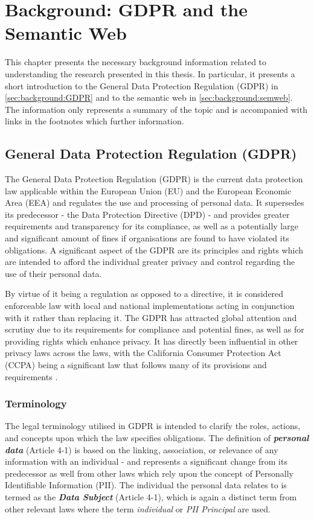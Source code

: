 \chapter{Background: GDPR and the Semantic Web}
\label{chapter:background}

This chapter presents the necessary background information related to understanding the research presented in this thesis. In particular, it presents a short introduction to the General Data Protection Regulation (GDPR) in \autoref{sec:background:GDPR} and to the semantic web in \autoref{sec:background:semweb}. The information only represents a summary of the topic and is accompanied with links in the footnotes which further information.

\section{General Data Protection Regulation (GDPR)}\label{sec:background:GDPR}
The General Data Protection Regulation (GDPR) \cite{noauthor_regulation_2016} is the current data protection law applicable within the European Union (EU) and the European Economic Area (EEA) and regulates the use and processing of personal data. 
It supersedes its predecessor - the Data Protection Directive (DPD) \cite{noauthor_directive_1995} - and provides greater requirements and transparency for its compliance, as well as a potentially large and significant amount of fines if organisations are found to have violated its obligations.
A significant aspect of the GDPR are its principles and rights which are intended to afford the individual greater privacy and control regarding the use of their personal data.

By virtue of it being a regulation as opposed to a directive, it is considered enforceable law with local and national implementations acting in conjunction with it rather than replacing it.
The GDPR has attracted global attention and scrutiny due to its requirements for compliance and potential fines, as well as for providing rights which enhance privacy.
It has directly been influential in other privacy laws across the laws, with the California Consumer Protection Act (CCPA) being a significant law that follows many of its provisions and requirements \cite{marini_gdpr_2018}.

\subsection{Terminology}
The legal terminology utilised in GDPR is intended to clarify the roles, actions, and concepts upon which the law specifies obligations.
The definition of \textit{\textbf{personal data}} (Article 4-1) is based on the linking, association, or relevance of any information with an individual - and represents a significant change from its predecessor as well from other laws which rely upon the concept of Personally Identifiable Information (PII). The individual the personal data relates to is termed as the \textit{\textbf{Data Subject}} (Article 4-1), which is again a distinct term from other relevant laws where the term \textit{individual} or \textit{PII Principal} are used.

